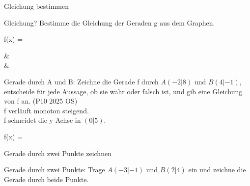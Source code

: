 \setcounter{aufgabe}{23}

\begin{aufgabe}{Gleichung bestimmen}
\begin{teile}
\teil Gleichung? Bestimme die Gleichung der Geraden g aus dem Graphen.

\begin{ksys}[xmin=-5,xmax=5,ymin=-5,ymax=5,ablesen]  \end{ksys}
f(x) = \leerfeld
\end{teile}
\begin{gleichungsraster}[2]
 &
 \\
 &
 \\
\end{gleichungsraster}
\begin{teile}
\teil Gerade durch A und B: Zeichne die Gerade f durch $A(-2|8)$ und $B(4|-1)$, entscheide für jede Aussage, ob sie wahr oder falsch ist, und gib eine Gleichung von f an. \hfill (P10 2025 OS) \\  f verläuft monoton steigend. \\  f schneidet die y-Achse in $(0|5)$.

\begin{ksys}[xmin=-4,xmax=5,ymin=-4,ymax=9] \end{ksys}
f(x) = \leerfeld
\end{teile}
\end{aufgabe}

\begin{aufgabe}{Gerade durch zwei Punkte zeichnen}
\begin{teile}
\teil Gerade durch zwei Punkte: Trage $A(-3|-1)$ und $B(2|4)$ ein und zeichne die Gerade durch beide Punkte.

\begin{ksys}[xmin=-4,xmax=4,ymin=-4,ymax=5] \end{ksys}
\end{teile}
\end{aufgabe}

